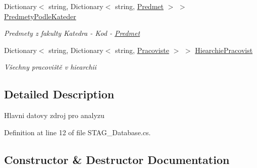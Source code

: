 \begin{DoxyCompactItemize}
Dictionary$<$ string, Dictionary$<$ string, \hyperlink{class_analyza_rozvrhu_1_1_s_t_a_g___classes_1_1_predmet}{Predmet} $>$ $>$ \hyperlink{class_analyza_rozvrhu_1_1_s_t_a_g___classes_1_1_s_t_a_g___database_ad3a541091f338a9ed628cc889ddc01f0}{Predmety\+Podle\+Kateder}
\begin{DoxyCompactList}\small\item\em Predmety z fakulty Katedra -\/ Kod -\/ \hyperlink{class_analyza_rozvrhu_1_1_s_t_a_g___classes_1_1_predmet}{Predmet} \end{DoxyCompactList}\item 
Dictionary$<$ string, Dictionary$<$ string, \hyperlink{class_analyza_rozvrhu_1_1_s_t_a_g___classes_1_1_pracoviste}{Pracoviste} $>$ $>$ \hyperlink{class_analyza_rozvrhu_1_1_s_t_a_g___classes_1_1_s_t_a_g___database_a86c85c4d262d6ce81e7da2e8abc3a531}{Hiearchie\+Pracovist}
\begin{DoxyCompactList}\small\item\em Všechny pracoviště v hiearchii \end{DoxyCompactList}\end{DoxyCompactItemize}


\subsection{Detailed Description}
Hlavni datovy zdroj pro analyzu 



Definition at line 12 of file S\+T\+A\+G\+\_\+\+Database.\+cs.



\subsection{Constructor \& Destructor Documentation}
\mbox{\label{class_analyza_rozvrhu_1_1_s_t_a_g___classes_1_1_s_t_a_g___database_a72bb593ee581a9ffa547441e30ad4fb5}} 
